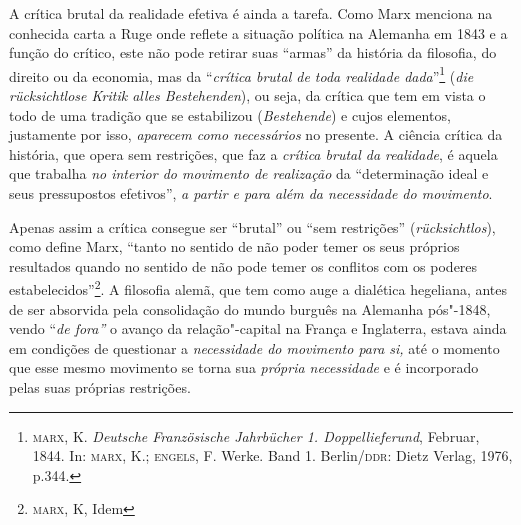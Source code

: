 A crítica brutal da realidade efetiva é ainda a tarefa. Como Marx
menciona na conhecida carta a Ruge onde reflete a situação política na
Alemanha em 1843 e a função do crítico, este não pode retirar suas
``armas'' da história da filosofia, do direito ou da economia, mas da
``\emph{crítica brutal de toda realidade dada}''\footnote{\textsc{marx},
  K. \emph{Deutsche Französische Jahrbücher 1. Doppellieferund},
  Februar, 1844. In: \textsc{marx}, K.; \textsc{engels}, F. Werke. Band
  1. Berlin/\textsc{ddr}: Dietz Verlag, 1976, p.344.} (\emph{die
rücksichtlose Kritik alles Bestehenden}), ou seja, da crítica que tem em
vista o todo de uma tradição que se estabilizou (\emph{Bestehende}) e
cujos elementos, justamente por isso, \emph{aparecem como necessários}
no presente. A ciência crítica da história, que opera sem restrições,
que faz a \emph{crítica brutal da realidade}, é aquela que trabalha
\emph{no interior do movimento de realização} da ``determinação ideal e
seus pressupostos efetivos'', \emph{a partir e para além da necessidade
do movimento}.

Apenas assim a crítica consegue ser ``brutal'' ou ``sem restrições''
(\emph{rücksichtlos}), como define Marx, ``tanto no sentido de não poder
temer os seus próprios resultados quando no sentido de não pode temer os
conflitos com os poderes estabelecidos''\footnote{\textsc{marx}, K, Idem}.
A filosofia alemã, que tem como auge a dialética hegeliana, antes de ser
absorvida pela consolidação do mundo burguês na Alemanha pós"-1848,
vendo ``\emph{de fora''} o avanço da relação"-capital na França e
Inglaterra, estava ainda em condições de questionar a \emph{necessidade
do movimento para si,} até o momento que esse mesmo movimento se torna
sua \emph{própria necessidade} e é incorporado pelas suas próprias
restrições.


